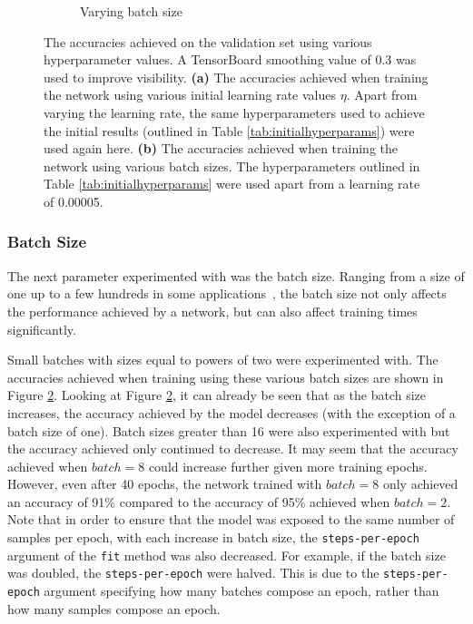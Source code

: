\begin{figure}[!t]
\begin{subfigure}[b]{0.49\textwidth}
        \caption{Varying batch size}
        \label{fig:bsplot}
    \end{subfigure}
    \caption{The accuracies achieved on the validation set using various hyperparameter values. A TensorBoard smoothing value of 0.3 was used to improve visibility. \textbf{(a)} The accuracies achieved when training the network using various initial learning rate values $\eta$. Apart from varying the learning rate, the same hyperparameters used to achieve the initial results (outlined in Table \ref{tab:initialhyperparams}) were used again here. \textbf{(b)} The accuracies achieved when training the network using various batch sizes. The hyperparameters outlined in Table \ref{tab:initialhyperparams} were used apart from a learning rate of 0.00005.}
\end{figure}

\subsubsection{Batch Size}

The next parameter experimented with was the batch size. Ranging from a size of one up to a few hundreds in some applications~\cite{bengio2012practical}, the batch size not only affects the performance achieved by a network, but can also affect training times significantly.

Small batches with sizes equal to powers of two were experimented with. The accuracies achieved when training using these various batch sizes are shown in Figure \ref{fig:bsplot}. Looking at Figure \ref{fig:bsplot}, it can already be seen that as the batch size increases, the accuracy achieved by the model decreases (with the exception of a batch size of one). Batch sizes greater than 16 were also experimented with but the accuracy achieved only continued to decrease. It may seem that the accuracy achieved when $batch=8$ could increase further given more training epochs. However, even after 40 epochs, the network trained with $batch=8$ only achieved an accuracy of 91\% compared to the accuracy of 95\% achieved when $batch=2$. Note that in order to ensure that the model was exposed to the same number of samples per epoch, with each increase in batch size, the \texttt{steps-per-epoch} argument of the \texttt{fit} method was also decreased. For example, if the batch size was doubled, the \texttt{steps-per-epoch} were halved. This is due to the \texttt{steps-per-epoch} argument specifying how many batches compose an epoch, rather than how many samples compose an epoch.

